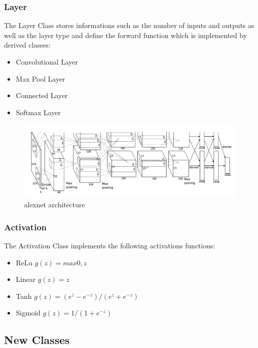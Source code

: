 \documentclass[parskip=full]{scrartcl}
\newcommand\tab[1][1cm]{\hspace*{#1}}
\begin{document}
		\subsubsection {Layer}
		\tab The Layer Class stores informations such as the number of inputs and outputs as well as the layer type and define the forward function which is implemented by derived classes:\\
		\begin{itemize}
			\item Convolutional Layer
			\item Max Pool Layer
			\item Connected Layer
			\item Softmax Layer
		\end{itemize}
		\begin{figure}
			\centering
			\includegraphics[width=1.0\textwidth]{alexnet-architecture}
			\caption{alexnet architecture}
			\label{fig:alexnet-architecture}
		\end{figure}
		
		\subsubsection {Activation}
		\tab The Activation Class implements the following activations functions:
		\begin{itemize}
			\item ReLu $g(z) = max{0, z}$
			\item Linear $g(z) =z$
			\item Tanh  $g(z) = (e^z -e^{-z}) / (e^z + e^{-z})$
			\item Sigmoid $g(z) = 1 / (1 + e^{-z})$
		\end{itemize}
		
	\subsection {New Classes}
\end{document}
